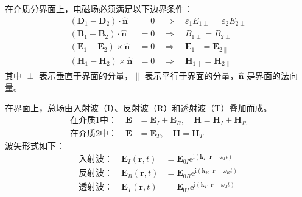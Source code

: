 \documentclass[fontset=none]{ctexart}
\begin{document}
\begin{theorem}[边界条件]
在介质分界面上，电磁场必须满足以下边界条件：
\begin{align}
(\bm{D}_1 - \bm{D}_2) \cdot \hat{\bm{n}} &= 0 \quad \Rightarrow \quad \varepsilon_1 E_{1\perp} 
= \varepsilon_2 E_{2\perp} \\
(\bm{B}_1 - \bm{B}_2) \cdot \hat{\bm{n}} &= 0 \quad \Rightarrow \quad B_{1\perp} = B_{2\perp} \\
(\bm{E}_1 - \bm{E}_2) \times \hat{\bm{n}} &= 0 \quad \Rightarrow \quad \bm{E}_{1\parallel} 
= \bm{E}_{2\parallel} \\
(\bm{H}_1 - \bm{H}_2) \times \hat{\bm{n}} &= 0 \quad \Rightarrow \quad \bm{H}_{1\parallel} 
= \bm{H}_{2\parallel}
\end{align}
其中 $\perp$ 表示垂直于界面的分量，$\parallel$ 表示平行于界面的分量，$\hat{\bm{n}}$ 是界面的法向量。
\end{theorem}

在界面上，总场由入射波（I）、反射波（R）和透射波（T）叠加而成。
\begin{align}
\text{在介质1中：} \quad \bm{E} &= \bm{E}_I + \bm{E}_R, \quad \bm{H} = \bm{H}_I + \bm{H}_R \\
\text{在介质2中：} \quad \bm{E} &= \bm{E}_T, \quad \bm{H} = \bm{H}_T
\end{align}
波矢形式如下：
\begin{align}
\text{入射波：} \quad \bm{E}_I(\bm{r}, t) 
&= \bm{E}_{0I} \mathrm{e}^{\mathrm{i}(\bm{k}_I \cdot \bm{r} - \omega_I t)} \\
\text{反射波：} \quad \bm{E}_R(\bm{r}, t) 
&= \bm{E}_{0R} \mathrm{e}^{\mathrm{i}(\bm{k}_R \cdot \bm{r} - \omega_R t)} \\
\text{透射波：} \quad \bm{E}_T(\bm{r}, t) 
&= \bm{E}_{0T} \mathrm{e}^{\mathrm{i}(\bm{k}_T \cdot \bm{r} - \omega_T t)}
\end{align}
\end{document}
